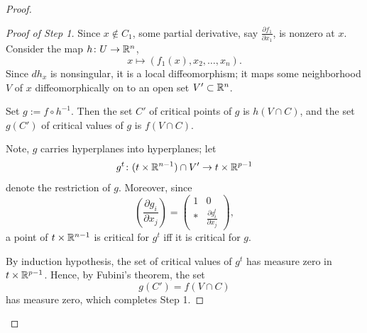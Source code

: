 \begin{proof}
\begin{proof}[Proof of Step 1]
        Since $x \notin C_1$, some partial derivative, say $\frac{\partial f_1}{\partial x_1}$, is nonzero at $x$. Consider the map $h \colon U \to \mathbb{R}^n$,
        \[
            x \mapsto (f_1(x), x_2, \ldots, x_n).
        \]
        Since $dh_x$ is nonsingular, it is a local diffeomorphism; it maps some neighborhood $V$ of $x$ diffeomorphically on to an open set $V' \subset \mathbb{R}^n$.

        \begin{center}
        \end{center}

        Set $g := f \circ h^{-1}$. Then the set $C'$ of critical points of $g$ is $h(V \cap C)$, and the set $g(C')$ of critical values of $g$ is $f(V \cap C)$.

        Note, $g$ carries hyperplanes into hyperplanes; let
        \[
            g^t \colon (t \times \mathbb{R}^{n-1}) \cap V' \to t \times \mathbb{R}^{p-1}
        \]
        denote the restriction of $g$. Moreover, since
        \[
            \left(\frac{\partial g_i}{\partial x_j}\right) = \begin{pmatrix} 1 & 0 \\ * & \frac{\partial g^t_i}{\partial x_j} \end{pmatrix},
        \]
        a point of $t \times \mathbb{R}^{n-1}$ is critical for $g^t$ iff it is critical for $g$.

        By induction hypothesis, the set of critical values of $g^t$ has measure zero in $t \times \mathbb{R}^{p-1}$. Hence, by Fubini's theorem, the set
        \[
            g(C') = f(V \cap C)
        \]
        has measure zero, which completes Step 1.
    \end{proof}


\end{proof}
